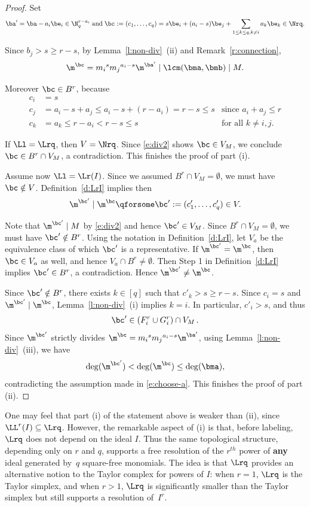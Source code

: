 \begin{proof}
 Set $$\ba'=\ba-a_i\be_i\in \N^{r-a_i}_q \; \textrm{and} \; \bc := (c_1, \ldots, c_q) =s \be_i + (a_i-s) \be_j + \sum_{1\le k\le
   q, k\ne i} a_k\be _k\in \Nrq.$$
 
 Since $b_j > s \geq r-s$, by Lemma~\ref{l:non-div}~\textup{(}ii\textup{)}
 and Remark~\ref{r:connection},
 \begin{equation}
 \label{e:div2}
 \m^{\bc} ={m_i}^{s}{m_j}^{a_i-s}\m^{\ba'} \mid \lcm(\bma, \bmb) \mid M.
 \end{equation}
 
  Moreover $\bc\in B^r$, because
\begin{align*}
c_i&=s &\\
c_j&= a_i-s+a_j\le a_i-s+(r-a_i)=r-s \le s &\mbox{since } a_i+a_j \leq r\\
c_k&=a_k\leq r - a_i<r-s\le s &\mbox{for all } k \neq i,j.
\end{align*}
 
If $\Ll=\Lrq$, then $V=\Nrq$. Since \eqref{e:div2} shows $\bc\in V_M$, we conclude $\bc\in B^r\cap V_{M}$, a contradiction. This finishes the proof  of part (i). 

Assume now $\Ll=\Lr(I)$. Since we assumed $B^r\cap V_{M}=\emptyset$, we must have  $\bc \notin V$. Definition~\ref{d:LrI} implies then $$\m^{\bc'} \mid \m^{\bc}
\qforsome \bc':=(c_1', \ldots, c_q') \in V.$$

Note that $\m^{\bc'}\mid M$ by \eqref{e:div2} and hence $\bc'\in
V_M$. Since $B^r\cap V_{M}=\emptyset$, we must have $\bc'\notin
B^r$. Using the notation in Definition~\ref{d:LrI}, let $V_a$ be the equivalence
class of which $\bc'$ is a representative. If $\m^{\bc'}=\m^{\bc}$,
then $\bc\in V_a$ as well, and hence $V_a\cap B^r\neq\emptyset$. Then
Step 1 in Definition~\ref{d:LrI} implies $\bc'\in B^r$, a contradiction. Hence
$\m^{\bc'}\ne \m^{\bc}$.
 
 Since  $\bc'\notin B^r$, there exists $k\in [q]$ such that
 $c'_k>s\ge r-s$. Since $c_i=s$ and $\m^{\bc'}\mid \m^{\bc}$, 
 Lemma~\ref{l:non-div}~\textup{(}i\textup{)} implies $k=i$.  In particular,
 $c'_i>s$, and thus  
 $$
   \bc'\in (F^r_i\cup G^r_i)\cap V_M\,. 
 $$
Since $\m^{\bc'}$ strictly divides
$\m^{\bc}={m_i}^{s}{m_j}^{a_i-s}\m^{\ba'}$, using Lemma~\ref{l:non-div}~\textup{(}iii\textup{)}, we have 
 $$\deg(\m^{\bc'})<\deg(\m^\bc) \leq
\deg(\bma),$$ contradicting the assumption made in
\eqref{e:choose-a}. This finishes the proof of part (ii). 
\end{proof}

\begin{rema}
	One may feel that part \textup{(}i\textup{)} of the statement above is weaker than \textup{(}ii\textup{)}, since $\LL^r(I)\subseteq \Lrq$. However, the remarkable aspect of \textup{(}i\textup{)} is that, before labeling, $\Lrq$ does not depend on the ideal $I$. Thus the same topological structure, depending only on $r$ and $q$, supports a free resolution of the $r^{th}$ power of {\bf any} ideal generated by~$q$ square-free monomials. The idea is that $\Lrq$ provides an alternative notion to the Taylor complex for powers of $I$: when $r=1$, $\Lrq$ is the Taylor simplex, and when $r>1$, $\Lrq$ is significantly smaller than the Taylor simplex but still supports a resolution of~$I^r$. 
\end{rema}
